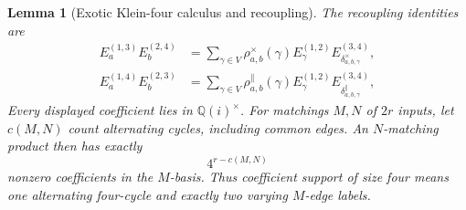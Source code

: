 \documentclass[11pt,letterpaper,onecolumn]{article}
\theoremstyle{plain}
\newtheorem{lemma}[lemma]{Lemma}
\theoremstyle{definition}
\theoremstyle{remark}
\begin{document}
\begin{lemma}[Exotic Klein-four calculus and recoupling]
The recoupling identities are
\begin{align*}
 E_a^{(1,3)}E_b^{(2,4)}
 &=\sum_{\gamma\in V}\rho^{\times}_{a,b}(\gamma)
   E_\gamma^{(1,2)}E_{\delta^\times_{a,b,\gamma}}^{(3,4)},
 \\
 E_a^{(1,4)}E_b^{(2,3)}
 &=\sum_{\gamma\in V}\rho^{\parallel}_{a,b}(\gamma)
   E_\gamma^{(1,2)}E_{\delta^\parallel_{a,b,\gamma}}^{(3,4)},
\end{align*}
Every displayed coefficient lies in \(\mathbb Q(i)^\times\).
For matchings \(M,N\) of \(2r\)
inputs, let \(c(M,N)\) count alternating cycles, including common edges.
An \(N\)-matching product then has exactly
\begin{equation}
 4^{r-c(M,N)}
 \label{eq:exotic-v4-overlap-size}
\end{equation}
nonzero coefficients in the \(M\)-basis. Thus coefficient support of
size four means one alternating four-cycle and exactly two varying
\(M\)-edge labels.
\end{lemma}
\end{document}

